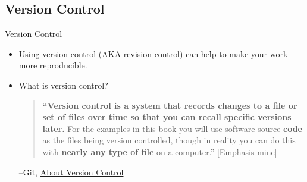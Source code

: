 \documentclass[aspectratio=169]{beamer}
\begin{document}
\subsection*{Version Control}
\begin{frame}{Version Control}
\begin{itemize}[<.->]
\item
Using version control (AKA revision control) can help to make your work more reproducible.

\item
What is version control?

\begin{quote}
\textbf{``Version control is a system that records changes to a file or set of files over time so that you can recall specific versions later.} For the examples in this book you will use software source \textbf{code} as the files being version controlled, though in reality you can do this with \textbf{nearly any type of file} on a computer.''  \tiny{[Emphasis mine]}
\end{quote}
--Git, \href{https://git-scm.com/book/en/v2/Getting-Started-About-Version-Control}{About Version Control}

\end{itemize}
\end{frame}
\end{document}
